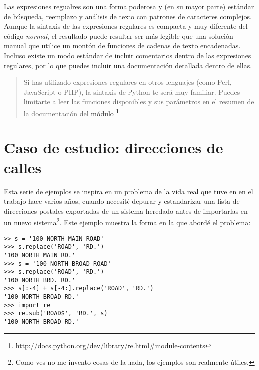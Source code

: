 Las expresiones regualres son una forma poderosa y (en su mayor parte) estándar de búsqueda, reemplazo y análisis de texto con patrones de caracteres complejos. Aunque la sintaxis de las expresiones regulares es compacta y muy diferente del código \emph{normal}, el resultado puede resultar ser más legible que una solución manual que utilice un montón de funciones de cadenas de texto encadenadas. Incluso existe un modo estándar de incluir comentarios dentro de las expresiones regulares, por lo que puedes incluir una documentación detallada dentro de ellas.

\begin{quote}
Si has utilizado expresiones regulares en otros lenguajes (como Perl, JavaScript o PHP), la sintaxis de Python te será muy familiar. Puedes limitarte a leer las funciones disponibles y sus parámetros en el resumen de la documentación del \href{http://docs.python.org/dev/library/re.html\#module-contents}{módulo }\footnote{\href{http://docs.python.org/dev/library/re.html\#module-contents}{http://docs.python.org/dev/library/re.html\#module-contents}}
\end{quote}

\section{Caso de estudio: direcciones de calles}

Esta serie de ejemplos se inspira en un problema de la vida real que tuve en en el trabajo hace varios años, cuando necesité depurar y estandarizar una lista de direcciones postales exportadas de un sistema heredado antes de importarlas en un nuevo sistema\footnote{Como ves no me invento cosas de la nada, los ejemplos son realmente útiles.}. Este ejemplo muestra la forma en la que abordé el problema:

\noindent\begin{minipage}{\textwidth}
\begin{lstlisting}[mathescape=False]
>> s = '100 NORTH MAIN ROAD'
>>> s.replace('ROAD', 'RD.')
'100 NORTH MAIN RD.'
>>> s = '100 NORTH BROAD ROAD'
>>> s.replace('ROAD', 'RD.')
'100 NORTH BRD. RD.'
>>> s[:-4] + s[-4:].replace('ROAD', 'RD.')
'100 NORTH BROAD RD.'
>>> import re
>>> re.sub('ROAD$', 'RD.', s)
'100 NORTH BROAD RD.'
\end{lstlisting}
\end{minipage}

